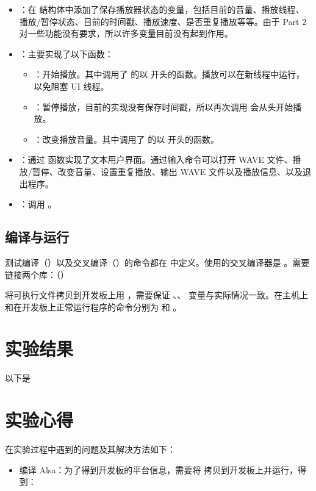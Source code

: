 \begin{itemize}
    \item {}：在  结构体中添加了保存播放器状态的变量，包括目前的音量、播放线程、播放/暂停状态、目前的时间戳、播放速度、是否重复播放等等。由于 Part 2 对一些功能没有要求，所以许多变量目前没有起到作用。
    \item {}：主要实现了以下函数：
    \begin{itemize}
        \item {}：开始播放。其中调用了  的以  开头的函数。播放可以在新线程中运行，以免阻塞 UI 线程。
        \item {}：暂停播放，目前的实现没有保存时间戳，所以再次调用  会从头开始播放。
        \item {}：改变播放音量。其中调用了  的以  开头的函数。
    \end{itemize}
    \item {}：通过  函数实现了文本用户界面。通过输入命令可以打开 WAVE 文件、播放/暂停、改变音量、设置重复播放、输出 WAVE 文件以及播放信息、以及退出程序。
    \item {}：调用 。
\end{itemize}

\subsection{编译与运行}\label{sec:compile}

测试编译（）以及交叉编译（）的命令都在  中定义。使用的交叉编译器是 。需要链接两个库：（\code{}）

将可执行文件拷贝到开发板上用 ，需要保证 、、 变量与实际情况一致。在主机上和在开发板上正常运行程序的命令分别为  和 。


\section{实验结果}

以下是


\newpage

\section{实验心得}\label{sec:problem}

在实验过程中遇到的问题及其解决方法如下：

\begin{itemize}
    \item 编译 Alsa：为了得到开发板的平台信息，需要将  拷贝到开发板上并运行，得到：
    
\end{itemize}
